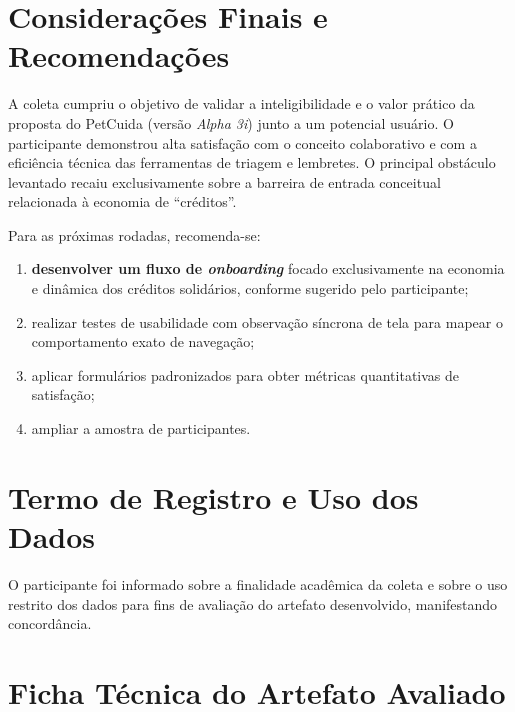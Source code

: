 \documentclass[12pt,a4paper]{article}
\begin{document}
\section{Considerações Finais e Recomendações}

A coleta cumpriu o objetivo de validar a inteligibilidade e o valor prático da proposta do PetCuida (versão \textit{Alpha 3i}) junto a um potencial usuário. O participante demonstrou alta satisfação com o conceito colaborativo e com a eficiência técnica das ferramentas de triagem e lembretes. O principal obstáculo levantado recaiu exclusivamente sobre a barreira de entrada conceitual relacionada à economia de \enquote{créditos}.

Para as próximas rodadas, recomenda-se:

\begin{enumerate}[label=\textbf{R\arabic*.},leftmargin=1.6cm]
  \item \textbf{desenvolver um fluxo de \textit{onboarding}} focado exclusivamente na economia e dinâmica dos créditos solidários, conforme sugerido pelo participante;
  \item realizar testes de usabilidade com observação síncrona de tela para mapear o comportamento exato de navegação;
  \item aplicar formulários padronizados para obter métricas quantitativas de satisfação;
  \item ampliar a amostra de participantes.
\end{enumerate}

\appendix
\section{Termo de Registro e Uso dos Dados}

O participante foi informado sobre a finalidade acadêmica da coleta e sobre o uso restrito dos dados para fins de avaliação do artefato desenvolvido, manifestando concordância.

\section{Ficha Técnica do Artefato Avaliado}
\end{document}
